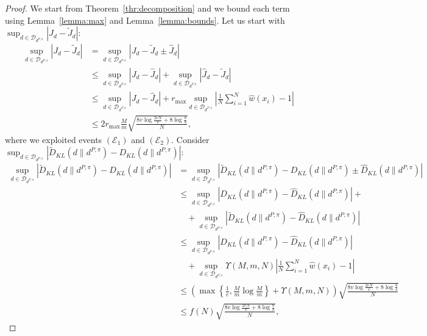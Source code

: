 \begin{proof}
	We start from Theorem~\ref{thr:decomposition} and we bound each term using Lemma~\ref{lemma:max} and Lemma~\ref{lemma:bounds}. Let us start with $\sup_{d \in \mathcal{D}_{d^{P,\pi}}} | J_d - \widetilde{J}_d |$:
	\begin{align*}
		\sup_{d \in \mathcal{D}_{d^{P,\pi}}} | J_d - \widetilde{J}_d | & = \sup_{d \in \mathcal{D}_{d^{P,\pi}}} | J_d - \widetilde{J}_d \pm \widehat{J}_d| \\
		& \le \sup_{d \in \mathcal{D}_{d^{P,\pi}}} | J_d - \widehat{J}_d | + \sup_{d \in \mathcal{D}_{d^{P,\pi}}} | \widehat{J}_d - \widetilde{J}_d |\\
		& \le \sup_{d \in \mathcal{D}_{d^{P,\pi}}} | J_d - \widehat{J}_d | + r_{\max} \sup_{d \in \mathcal{D}_{d^{P,\pi}}}  \left| \frac{1}{N} \sum_{i=1}^N \widehat{w}(x_i) - 1  \right| \\
		& \le 2r_{\max} \frac{M}{m} \sqrt{\frac{8v \log\frac{2eN}{v} + 8 \log \frac{8}{\delta}}{N}},
	\end{align*}
	where we exploited events $(\mathcal{E}_1)$ and $(\mathcal{E}_2)$. Consider $\sup_{d \in \mathcal{D}_{d^{P,\pi}}} \left| {\widetilde{D}}_{KL}(d \|d^{P,\pi})- D_{KL}(d \|d^{P,\pi})\right|$:
	\begin{align*}
		\sup_{d \in \mathcal{D}_{d^{P,\pi}}} \left| {\widetilde{D}}_{KL}(d \|d^{P,\pi})- D_{KL}(d \|d^{P,\pi})\right| & = \sup_{d \in \mathcal{D}_{d^{P,\pi}}} \left| {\widetilde{D}}_{KL}(d \|d^{P,\pi})- D_{KL}(d \|d^{P,\pi}) \pm {\widehat{D}}_{KL}(d \|d^{P,\pi})\right| \\
		& \le \sup_{d \in \mathcal{D}_{d^{P,\pi}}} \left| {{D}}_{KL}(d \|d^{P,\pi})- {\widehat{D}}_{KL}(d \|d^{P,\pi})\right| + \\ & \quad + \sup_{d \in \mathcal{D}_{d^{P,\pi}}} \left| {\widetilde{D}}_{KL}(d \|d^{P,\pi})- {\widehat{D}}_{KL}(d \|d^{P,\pi})\right| \\
		& \le \sup_{d \in \mathcal{D}_{d^{P,\pi}}} \left| {{D}}_{KL}(d \|d^{P,\pi})- {\widehat{D}}_{KL}(d \|d^{P,\pi})\right| \\
		& \quad + \sup_{d \in \mathcal{D}_{d^{P,\pi}}} \Upsilon(M,m,N) \left| \frac{1}{N} \sum_{i=1}^N \widehat{w}(x_i)- 1 \right| \\
		& \le \left( \max \left\{ \frac{1}{e}, \frac{M}{m} \log \frac{M}{m} \right\} + \Upsilon(M,m,N) \right) \sqrt{\frac{8v \log\frac{2eN}{v} + 8 \log \frac{8}{\delta}}{N}} \\
		& \le f(N) \sqrt{\frac{8v \log\frac{2eN}{v} + 8 \log \frac{8}{\delta}}{N}},
	\end{align*}

\end{proof}
